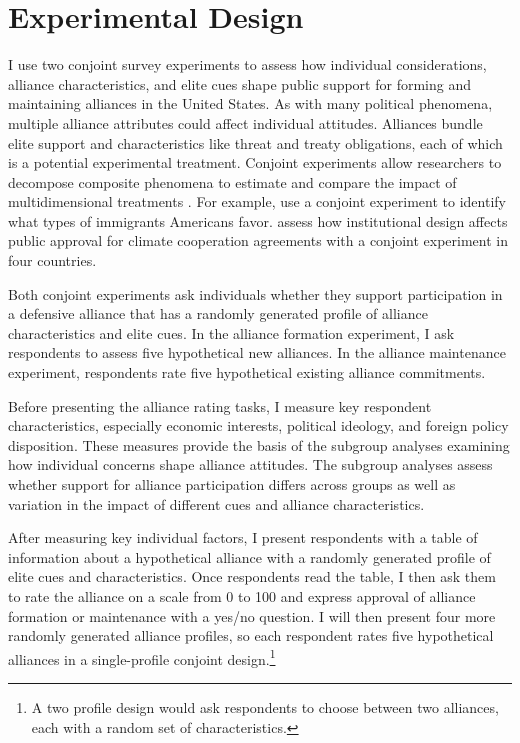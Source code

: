 \documentclass[12pt]{article}
\begin{document}
\section{Experimental Design}


I use two conjoint survey experiments to assess how individual considerations, alliance characteristics, and elite cues shape public support for forming and maintaining alliances in the United States. 
As with many political phenomena, multiple alliance attributes could affect individual attitudes. 
Alliances bundle elite support and characteristics like threat and treaty obligations, each of which is a potential experimental treatment.  
Conjoint experiments allow researchers to decompose composite phenomena to estimate and compare the impact of multidimensional treatments \citep{Hainmuelleretal2014}. 
For example, \citet{HainmuellerHopkins2015} use a conjoint experiment to identify what types of immigrants Americans favor. 
\citet{BechtelScheve2013} assess how institutional design affects public approval for climate cooperation agreements with a conjoint experiment in four countries. 


Both conjoint experiments ask individuals whether they support participation in a defensive alliance that has a randomly generated profile of alliance characteristics and elite cues. 
In the alliance formation experiment, I ask respondents to assess five hypothetical new alliances. 
In the alliance maintenance experiment, respondents rate five hypothetical existing alliance commitments.


Before presenting the alliance rating tasks, I measure key respondent characteristics, especially economic interests, political ideology, and foreign policy disposition.  
These measures provide the basis of the subgroup analyses examining how individual concerns shape alliance attitudes. 
The subgroup analyses assess whether support for alliance participation differs across groups as well as variation in the impact of different cues and alliance characteristics.


After measuring key individual factors, I present respondents with a table of information about a hypothetical alliance with a randomly generated profile of elite cues and characteristics.
Once respondents read the table, I then ask them to rate the alliance on a scale from 0 to 100 and express approval of alliance formation or maintenance with a yes/no question. 
I will then present four more randomly generated alliance profiles, so each respondent rates five hypothetical alliances in a single-profile conjoint design.\footnote{A two profile design would ask respondents to choose between two alliances, each with a random set of characteristics.} 
\end{document}
